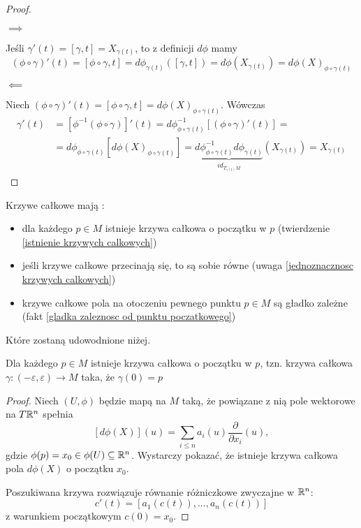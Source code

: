 \begin{proof}$ $\newline

  $\implies$

  Jeśli $\gamma'(t)=[\gamma,t]=X_{\gamma(t)}$, to z definicji $d\phi$ mamy 
\reversemarginpar{}
  $$(\phi\circ\gamma)'(t)=[\phi\circ\gamma,t]=d\phi_{\gamma(t)}([\gamma,t])=d\phi(X_{\gamma(t)})=d\phi(X)_{\phi\circ\gamma(t)}$$

  $\impliedby$

  Niech $(\phi\circ\gamma)'(t)=[\phi\circ\gamma,t]=d\phi(X)_{\phi\circ\gamma(t)}$. Wówczas
  \begin{align*}
    \gamma'(t)&=[\phi^{-1}(\phi\circ\gamma)]'(t)=d\phi^{-1}_{ \phi\circ\gamma(t)}[ (\phi\circ\gamma)'(t)]=\\
              &=d\phi_{\phi\circ\gamma(t)}[d\phi(X)_{\phi\circ\gamma(t)}]= \underbrace{d\phi^{-1}_{\phi\circ\gamma(t)}d\phi_{\gamma(t)}}_{id_{T_{\gamma(t)}M}}(X_{\gamma(t)})=X_{\gamma(t)}
  \end{align*}
\end{proof}

Krzywe całkowe mają :
\begin{itemize}
  \item dla każdego $p\in M$ istnieje krzywa całkowa o początku w $p$ (twierdzenie \ref{istnienie krzywych calkowych})
  \item jeśli krzywe całkowe przecinają się, to są sobie równe (uwaga \ref{jednoznacznosc krzywych calkowych})
  \item krzywe całkowe pola na otoczeniu pewnego punktu $p\in M$ są gładko zależne (fakt \ref{gladka zaleznosc od punktu poczatkowego})
\end{itemize}
Które zostaną udowodnione niżej.

\begin{theorem}\label{istnienie krzywych calkowych} Dla każdego $p\in M$ istnieje krzywa całkowa o początku w $p$, tzn. krzywa całkowa $\gamma:(-\varepsilon,\varepsilon)\to M$ taka, że $\gamma(0)=p$
\end{theorem}

\begin{proof}
  Niech $(U,\phi)$ będzie mapą na $M$ taką, że powiązane z nią pole wektorowe na $T\mathbb{R}^n$ spełnia
  $$[d\phi(X)](u)=\sum_{i\leq n}a_i(u)\frac{\partial}{\partial{x_i}}(u),$$ 
  gdzie $\phi(p)=x_0\in\phi(U)\subseteq\mathbb{R}^n$. Wystarczy pokazać, że istnieje krzywa całkowa pola $d\phi(X)$ o początku $x_0$.

  Poszukiwana krzywa rozwiązuje równanie różniczkowe zwyczajne w $\mathbb{R}^n$:
  $$c'(t)=[a_1(c(t)), ...,a_n(c(t))]$$
  z warunkiem początkowym $c(0)=x_0$.
\end{proof}

